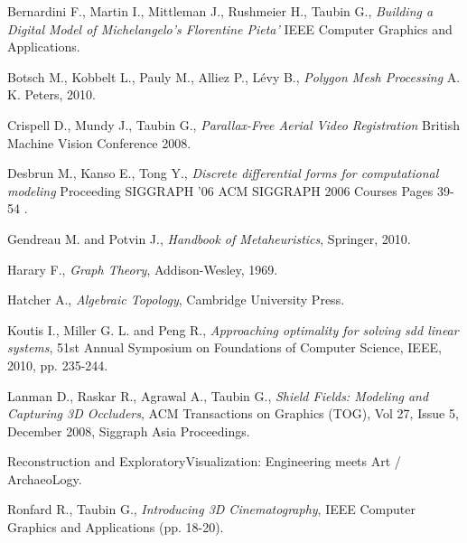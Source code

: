\documentclass[conference,compsoc,a4paper]{IEEEtran}
\begin{document}
\renewcommand\refname{Referencias}

\begin{thebibliography}{1}

Bernardini F., Martin I., Mittleman J., Rushmeier H., Taubin G.,
\newblock \textit{Building a Digital Model of Michelangelo's Florentine Pieta'}
\newblock IEEE Computer Graphics and Applications.

Botsch M., Kobbelt L., Pauly M., Alliez P., Lévy B.,
\newblock \textit{Polygon Mesh Processing}
\newblock A. K. Peters, 2010.

Crispell D., Mundy J., Taubin G.,
\newblock \textit{Parallax-Free Aerial Video Registration}
\newblock British Machine Vision Conference 2008.

Desbrun M., Kanso E., Tong Y.,
\newblock \textit{Discrete differential forms for computational 
modeling}
\newblock Proceeding SIGGRAPH '06 ACM SIGGRAPH 2006 Courses Pages 
39-54 .
 
Gendreau M. and Potvin J., 
\newblock \textit{Handbook of Metaheuristics}, 
\newblock Springer, 2010.

Harary F., 
\newblock \textit{Graph Theory}, 
\newblock Addison-Wesley, 1969.

Hatcher A., 
\newblock \textit{Algebraic Topology}, 
\newblock Cambridge University Press.

Koutis I., Miller G. L. and Peng R., 
\newblock \textit{Approaching optimality for solving sdd linear systems}, 
\newblock 51st Annual Symposium on Foundations of Computer Science, IEEE, 
2010, pp. 235-244.

Lanman D., Raskar R., Agrawal A., Taubin G., 
\newblock \textit{Shield Fields: Modeling and Capturing 3D Occluders}, 
\newblock ACM Transactions on Graphics (TOG), Vol 27, Issue 5, December 
2008, Siggraph Asia Proceedings.

\newblock Reconstruction and ExploratoryVisualization: Engineering 
meets Art / ArchaeoLogy.

Ronfard R., Taubin G., 
\newblock \textit{Introducing 3D Cinematography}, 
\newblock IEEE Computer Graphics and Applications (pp. 18-20).


\end{thebibliography}
\end{document}

